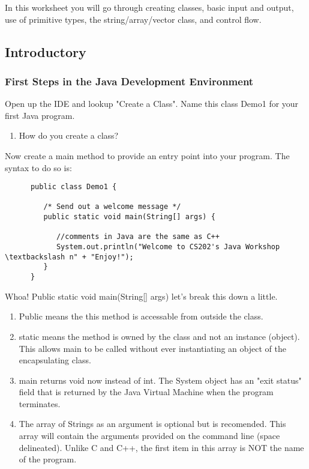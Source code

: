 \documentclass[../../main.tex]{subfiles}
\begin{document}
In this worksheet you will go through creating classes, basic input and output, use of primitive types, the string/array/vector class, and control flow.
\subsection{Introductory}
\subsubsection{First Steps in the Java Development Environment}
\begin{steps}
   \item Open up the IDE and lookup "Create a Class". Name this class Demo1 for your first Java program.
   \begin{enumerate}[label=\Alph*.]
   \item How do you create a class?
   \end{enumerate} 
   \item Now create a main method to provide an entry point into your program. The syntax to do so is: \\
      \begin{verbatim}
      public class Demo1 {

         /* Send out a welcome message */
         public static void main(String[] args) {

            //comments in Java are the same as C++
            System.out.println("Welcome to CS202's Java Workshop \textbackslash n" + "Enjoy!");
         }
      }
\end{verbatim}
   Whoa! Public static void main(String[] args) let's break this down a little.
   \begin{enumerate}[label=\Alph*.]
   \item Public means the this method is accessable from outside the class.
   \item static means the method is owned by the class and not an instance (object). This allows main to be called without ever instantiating an object of the encapsulating class.
   \item main returns void now instead of int. The System object has an "exit status" field that is returned by the Java Virtual Machine when the program terminates.
   \item The array of Strings as an argument is optional but is recomended. This array will contain the arguments provided on the command line (space delineated). Unlike C and C++, the first item in this array is NOT the name of the program.
   \end{enumerate} 


\end{steps}
\end{document}
